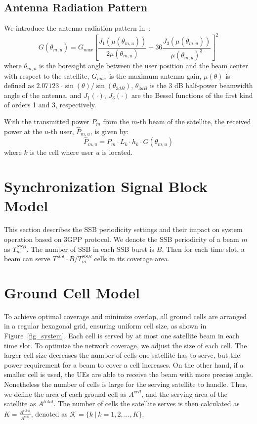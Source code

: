 \subsection{Antenna Radiation Pattern}
We introduce the antenna radiation pattern in~\cite{Energy-Efficient}:
\begin{equation}
    G(\theta_{m,u}) = G_{max} \left[ \frac{J_1\left(\mu(\theta_{m,u})\right)}{2\mu(\theta_{m,u})}
    + 36 \frac{J_3\left(\mu(\theta_{m,u})\right)}{\mu(\theta_{m,u})^3} \right]^2
\end{equation}
where $\theta_{m,u}$ is the boresight angle between the user position and the beam center with respect to the satellite, $G_{max}$ is the maximum antenna gain, $\mu(\theta)$ is defined as $2.07123 \cdot \sin(\theta)/\sin(\theta_{3dB})$, $\theta_{3dB}$ is the 3 dB half-power beamwidth angle of the antenna, and $J_1(\cdot)$, $J_3(\cdot)$ are the Bessel functions of the first kind of orders 1 and 3, respectively.

With the transmitted power $P_{m}$ from the $m$-th beam of the satellite, the received power at the $u$-th user, $\hat{P}_{m,u}$, is given by:
\begin{equation}
    \hat{P}_{m,u} = P_{m} \cdot L_{k} \cdot h_{k} \cdot G(\theta_{m,u})
\end{equation}
where $k$ is the cell where user $u$ is located.

\section{Synchronization Signal Block Model}

This section describes the SSB periodicity settings and their impact on system operation based on 3GPP protocol. We denote the SSB periodicity of a beam $m$ as $T^{SSB}_m$. The number of SSB in each SSB burst is $B$. Then for each time slot, a beam can serve $T^{slot} \cdot B / T^{SSB}_m$ cells in its coverage area.

\section{Ground Cell Model}

To achieve optimal coverage and minimize overlap, all ground cells are arranged in a regular hexagonal grid, ensuring uniform cell size, as shown in Figure~\ref{fig_system}. Each cell is served by at most one satellite beam in each time slot. To optimize the network coverage, we adjust the size of each cell. The larger cell size decreases the number of cells one satellite has to serve, but the power requirement for a beam to cover a cell increases. On the other hand, if a smaller cell is used, the UEs are able to receive the beam with more precise angle. Nonetheless the number of cells is large for the serving satellite to handle. Thus, we define the area of each ground cell as $A^{cell}$, and the serving area of the satellite as $A^{total}$. The number of cells the satellite serves is then calculated as $K = \frac{A^{total}}{A^{cell}}$, denoted as $\mathcal{K} = \{k\ |\ k = 1, 2, \ldots, K\}$.

